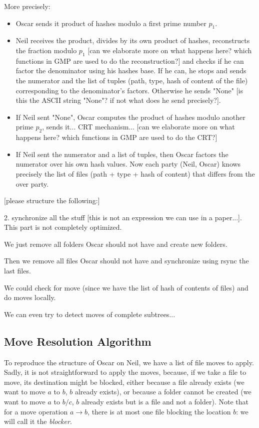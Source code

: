 \documentclass[11pt]{llncs}
\begin{document}
More precisely:
\begin{itemize}
\item Oscar sends it product of hashes modulo a first prime number $p_1$.
\item Neil receives the product, divides by its own product of hashes, reconstructs the fraction modulo $p_1$ [can we elaborate more on what happens here? which functions in GMP are used to do the reconstruction?] and checks if he can factor the denominator using his hashes base. If he can, he stops and sends the numerator and the list of tuples (path, type, hash of content of the file) corresponding to the denominator's factors. Otherwise he sends "None" [is this the ASCII string "None"? if not what does he send precisely?].
\item If Neil sent "None", Oscar computes the product of hashes modulo another prime $p_2$, sends it... CRT mechanism... [can we elaborate more on what happens here? which functions in GMP are used to do the CRT?]
\item If Neil sent the numerator and a list of tuples, then Oscar factors the numerator over his own hash values. Now each party (Neil, Oscar) knows precisely the list of files (path + type + hash of content) that differs from the over party.
\end{itemize}

[please structure the following:]\smallskip

2. synchronize all the stuff [this is not an expression we can use in a paper...]. This part is not completely optimized.\smallskip

We just remove all folders Oscar should not have and create new folders.\smallskip

Then we remove all files Oscar should not have and synchronize using rsync the last files.\smallskip

We could check for move (since we have the list of hash of contents of files) and do moves locally.\smallskip

We can even try to detect moves of complete subtrees...\smallskip

\subsection{Move Resolution Algorithm}

To reproduce the structure of Oscar on Neil, we have a list of file moves to apply. Sadly, it is not straightforward to apply the moves, because, if we take a file to move, its destination might be blocked, either because a file already exists (we want to move $a$ to $b$, $b$ already exists), or because a folder cannot be created (we want to move $a$ to $b/c$, $b$ already exists but is a file and not a folder). Note that for a move operation $a \rightarrow b$, there is at most one file blocking the location $b$: we will call it the \emph{blocker}.
\end{document}
